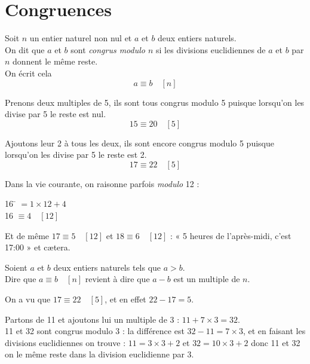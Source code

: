\section{Congruences}

\begin{definition}[]
	Soit $n$ un entier naturel non nul et $a$ et $b$ deux entiers naturels.\\
	On dit que $a$ et $b$ sont \textit{congrus modulo $n$} si les divisions euclidiennes de $a$ et $b$ par $n$ donnent le même reste.\\
	On écrit cela $$a\equiv b\quad [n]$$
\end{definition}
\begin{exemple}[]
	\begin{enumalph}
		\item 	Prenons deux multiples de 5, ils sont tous congrus modulo 5 puisque lorsqu'on les divise par 5 le reste est nul.\\
		$$15\equiv 20\quad[5]$$
		\item 	Ajoutons leur 2 à tous les deux, ils sont encore congrus modulo 5 puisque lorsqu'on les divise par 5 le reste est 2.
		$$17\equiv 22\quad[5]$$
		\item 	Dans la vie courante, on raisonne parfois \textit{modulo} 12 :
		\begin{tabbing}
			16 \= $=1\times 12 +4$\\
			16	\>$\equiv 4 \quad[12]$
		\end{tabbing}
		Et de même $17\equiv 5 \quad[12]$ et $18\equiv 6 \quad[12]$ : 	 «  5 heures de l'après-midi, c'est 17:00 »  et c\ae tera.
	\end{enumalph}
\end{exemple}
\begin{propriete}[]
	Soient $a$ et $b$ deux entiers naturels tels que $a>b$.\\
	Dire que $a\equiv b\quad[n]$ revient à dire que $a-b$ est un multiple de $n$.
\end{propriete}
\begin{exemple}[s]
	\begin{enumalph}
		\item 	On a vu que $17\equiv 22\quad[5]$, et en effet $22-17=5$.
		\item 	Partons de 11 et ajoutons lui un multiple de 3 : $11+7\times 3 = 32$.\\
		11 et 32 sont congrus modulo 3 : la différence est $32-11=7\times 3$, et en faisant les divisions euclidiennes on trouve :
		$11=3\times 3 +2$ et $32=10\times 3+2$ donc 11 et 32 on le même reste dans la division euclidienne par 3.
	\end{enumalph}
\end{exemple}

